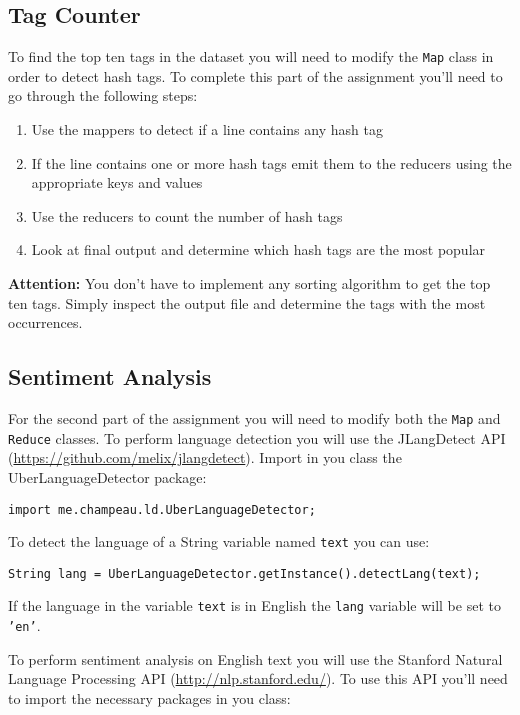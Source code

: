 \documentclass[a4paper,10pt]{article}
\begin{document}
\subsection{Tag Counter}
To find the top ten tags in the dataset you will need to modify the \texttt{Map} class in order to detect hash tags. To complete this part of the assignment you'll need to go through the following steps: 

\begin{enumerate}
 \item Use the mappers to detect if a line contains any hash tag
 \item If the line contains one or more hash tags emit them to the reducers using the appropriate keys and values 
 \item Use the reducers to count the number of hash tags 
 \item Look at final output and determine which hash tags are the most popular
\end{enumerate}

\textbf{Attention:} You don't have to implement any sorting algorithm to get the top ten tags. Simply inspect the output file and determine the tags with the most occurrences. 

\subsection{Sentiment Analysis}
For the second part of the assignment you will need to modify both the \texttt{Map} and \texttt{Reduce} classes. To perform language detection you will use the JLangDetect API (\url{https://github.com/melix/jlangdetect}). Import in you class the UberLanguageDetector package: 

\lstset{language=Java}      
\begin{lstlisting}
import me.champeau.ld.UberLanguageDetector;
\end{lstlisting}

To detect the language of a String variable named \texttt{text} you can use: 

\begin{lstlisting}
String lang = UberLanguageDetector.getInstance().detectLang(text);
\end{lstlisting}

If the language in the variable \texttt{text} is in English the \texttt{lang} variable will be set to \texttt{'en'}. 

To perform sentiment analysis on English text you will use the Stanford Natural Language Processing API (\url{http://nlp.stanford.edu/}). To use this API you'll need to import the necessary packages in you class: 
\end{document}
